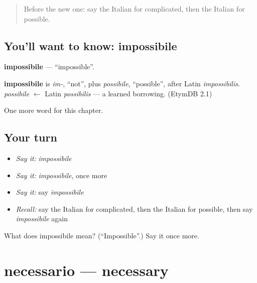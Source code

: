 \label{lesson:IT-C157-impossibile}



\begin{quote}
Before the new one: say the Italian for complicated, then the Italian for possible.
\end{quote}

\subsection*{You'll want to know: impossibile}
\textbf{impossibile} — \textquotedblleft{}impossible\textquotedblright{}.

\begin{cousinweb}
\textbf{impossibile} is \emph{im-}, \textquotedblleft{}not\textquotedblright{}, plus \emph{possibile}, \textquotedblleft{}possible\textquotedblright{}, after Latin \emph{impossibilis}. \emph{possibile} $\leftarrow$ Latin \emph{possibilis} — a learned borrowing. (EtymDB 2.1)
\end{cousinweb}

\begin{grammarlens}[title={What you've built}]
One more word for this chapter.
\end{grammarlens}

\subsection*{Your turn}
\begin{itemize}
\raggedright
  \item \emph{Say it:} \emph{impossibile}
  \item \emph{Say it:} \emph{impossibile}, once more
  \item \emph{Say it:} say \emph{impossibile}
  \item \emph{Recall:} say the Italian for complicated, then the Italian for possible, then say \emph{impossibile} again
\end{itemize}

\begin{tcolorbox}[breakable,colback=teal!4,colframe=teal!35!black,title={Before you move on}]
What does impossibile mean? (\textquotedblleft{}Impossible\textquotedblright{}.) Say it once more.
\end{tcolorbox}
\section[necessario]{necessario — necessary}

